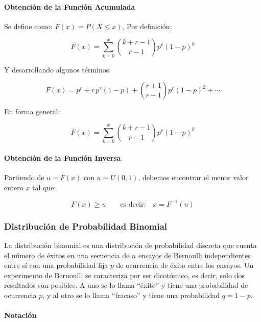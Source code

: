 \documentclass{article}
\begin{document}
\paragraph{Obtención de la Función Acumulada}

Se define como: $F(x) = P(X \leq x)$. Por definición:

\begin{equation}
    F(x) = \sum_{k=0}^{x} \binom{k + r - 1}{r - 1} p^r (1-p)^k
\end{equation}

Y desarrollando algunos términos:

\begin{equation}
    F(x) = p^r + r\,p^r(1-p) + \binom{r+1}{r-1} p^r(1-p)^2 + \cdots
\end{equation}

En forma general:

\begin{equation}
    F(x) = \sum_{k=0}^{x} \binom{k + r - 1}{r - 1} p^r (1-p)^k
\end{equation}

\paragraph{Obtención de la Función Inversa}

Partiendo de $u = F(x)$ con $u \sim U(0, 1)$, debemos encontrar el menor valor entero $x$
tal que:

\begin{equation}
    F(x) \geq u \qquad \text{es decir:} \quad x = F^{-1}(u)
\end{equation}


\subsubsection{Distribución de Probabilidad Binomial}

La distribución binomial es una distribución de probabilidad discreta que cuenta el número
de éxitos en una secuencia de $n$ ensayos de Bernoulli independientes entre sí con una
probabilidad fija $p$ de ocurrencia de éxito entre los ensayos. Un experimento de Bernoulli
se caracteriza por ser dicotómico, es decir, solo dos resultados son posibles. A uno se lo
llama ``éxito'' y tiene una probabilidad de ocurrencia $p$, y al otro se lo llama ``fracaso'' y
tiene una probabilidad $q = 1 - p$.

\paragraph{Notación}
\end{document}
